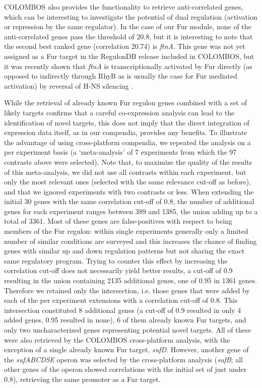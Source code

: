 COLOMBOS also provides the functionality to retrieve anti-correlated genes,  which can be interesting to investigate the potential of dual regulation  (activation or repression by the same regulator). In the case of our Fur  module, none of the anti-correlated genes pass the threshold of 20.8, but it is  interesting to note that the second best ranked gene (correlation 20.74) is  {\it ftnA}. This gene was not yet assigned as a Fur target in the RegulonDB  release included in COLOMBOS, but it was recently shown that {\it ftnA} is  transcriptionally activated by Fur directly (as opposed to indirectly through  RhyB as is usually the case for Fur mediated activation) by reversal of H-NS  silencing \cite{Nandal2010}.

While the retrieval of already known Fur regulon genes combined with a set of likely targets confirms that a careful co-expression analysis can lead to the identification of novel targets, this does not imply that the direct integration of expression data itself, as in our compendia, provides any benefits. To illustrate the advantage of using cross-platform compendia, we repeated the analysis on a per experiment basis (a `meta-analysis' of 7 experiments from which the 97 contrasts above were selected). Note that, to maximize the quality of the results of this meta-analysis, we did not use all contrasts within each experiment, but only the most relevant ones (selected with the same relevance cut-off as before), and that we ignored experiments with two contrasts or less. When extending the initial 30 genes with the same correlation cut-off of 0.8, the number of additional genes for each experiment ranges between 389 and 1385, the union adding up to a total of 3361. Most of these genes are false-positives with respect to being members of the Fur regulon: within single experiments generally only a limited number of similar conditions are surveyed and this increases the chance of finding genes with similar up and down regulation patterns but not sharing the exact same regulatory program. Trying to counter this effect by increasing the correlation cut-off does not necessarily yield better results, a cut-off of 0.9 resulting in the union containing 2135 additional genes, one of 0.95 in 1361 genes. Therefore we retained only the intersection, i.e. those genes that were added by each of the per experiment extensions with a correlation cut-off of 0.8. This intersection constituted 8 additional genes (a cut-off of 0.9 resulted in only 4 added genes, 0.95 resulted in none), 6 of them already known Fur targets, and only two uncharacterized genes representing potential novel targets. All of these were also retrieved by the COLOMBOS cross-platform analysis, with the exception of a single already known Fur target, {\it sufD}. However, another gene of the {\it sufABCDSE} operon was selected by the cross-platform analysis ({\it sufB}; all other genes of the operon showed correlations with the initial set of just under 0.8), retrieving the same promoter as a Fur target.



